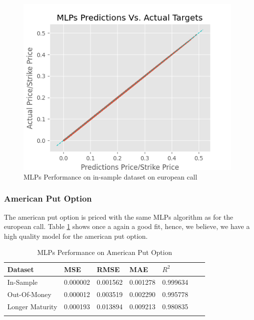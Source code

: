 \begin{figure}[th]
\centering
\includegraphics{Figures/PredictionEuroC.png}
\decoRule
\caption[MLPs Performance on in-sample dataset European Call]{MLPs Performance on in-sample dataset on european call}
\label{fig:MLPsInSampleEuroC}
\end{figure}


\subsubsection{American Put Option}
The american put option is priced with the same MLPs algorithm as for the european call. Table \ref{tab:AmerPerformanceComparision} shows once a again a good fit, hence, we believe, we have a high quality model for the american put option.

\begin{table}[th]
\caption{MLPs Performance on American Put Option}
\label{tab:AmerPerformanceComparision}
\centering
\begin{tabular}{l l l l l l l }
\toprule
\textbf{Dataset} & \textbf{MSE} & \textbf{RMSE} & \textbf{MAE} & \textbf{$R^2$} \\
\midrule
In-Sample & 0.000002 & 0.001562 & 0.001278 & 0.999634\\
Out-Of-Money & 0.000012 & 0.003519 & 0.002290 & 0.995778\\
Longer Maturity & 0.000193 & 0.013894 & 0.009213 & 0.980835\\
\bottomrule\\
\end{tabular}
\end{table}


